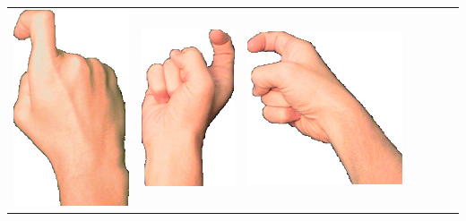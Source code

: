 \documentclass{article}
\begin{document}
\begin{center}
\begin{tabular}{r*{6}{c}}
\includegraphics[scale=0.1]{images/01-04-3.jpg}&
\includegraphics[scale=0.1]{images/01-04-4.jpg}&
\includegraphics[scale=0.1]{images/01-04-5.jpg}&

\end{tabular}
\end{center}
\end{document}
